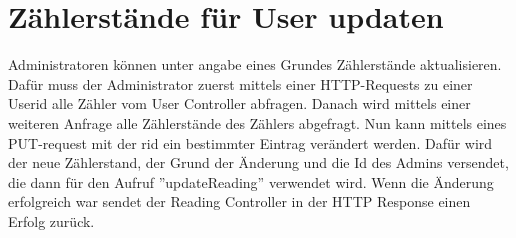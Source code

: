 \section{Zählerstände für User updaten}
Administratoren können unter angabe eines Grundes Zählerstände aktualisieren.
Dafür muss der Administrator zuerst mittels einer HTTP-Requests zu einer Userid alle Zähler vom User Controller abfragen. Danach wird mittels einer weiteren Anfrage alle Zählerstände des Zählers abgefragt. Nun kann mittels eines PUT-request mit der rid ein bestimmter Eintrag verändert werden. Dafür wird der neue Zählerstand, der Grund der Änderung und die Id des Admins versendet, die dann für den Aufruf ''updateReading'' verwendet wird. Wenn die Änderung erfolgreich war sendet der Reading Controller in der HTTP Response einen Erfolg zurück.